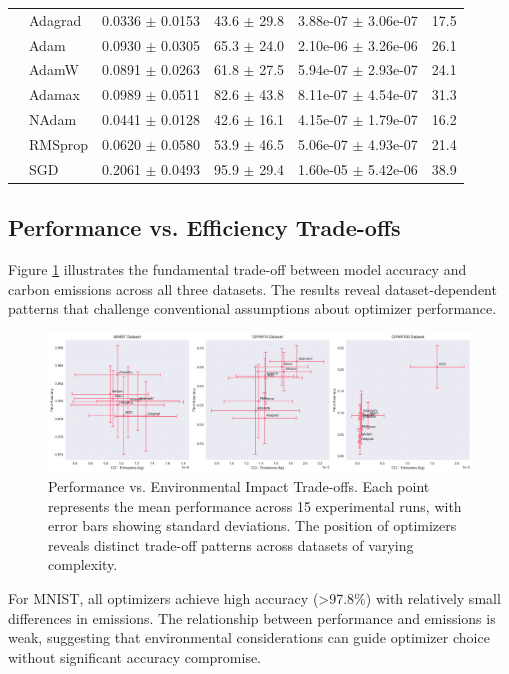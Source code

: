 \documentclass[conference]{IEEEtran}
\begin{document}
\begin{table}[htbp]
\begin{tabular}{@{}llcccr@{}}
& Adagrad & 0.0336 $\pm$ 0.0153 & 43.6 $\pm$ 29.8 & 3.88e-07 $\pm$ 3.06e-07 & 17.5 \\
& Adam & 0.0930 $\pm$ 0.0305 & 65.3 $\pm$ 24.0 & 2.10e-06 $\pm$ 3.26e-06 & 26.1 \\
& AdamW & 0.0891 $\pm$ 0.0263 & 61.8 $\pm$ 27.5 & 5.94e-07 $\pm$ 2.93e-07 & 24.1 \\
& Adamax & 0.0989 $\pm$ 0.0511 & 82.6 $\pm$ 43.8 & 8.11e-07 $\pm$ 4.54e-07 & 31.3 \\
& NAdam & 0.0441 $\pm$ 0.0128 & 42.6 $\pm$ 16.1 & 4.15e-07 $\pm$ 1.79e-07 & 16.2 \\
& RMSprop & 0.0620 $\pm$ 0.0580 & 53.9 $\pm$ 46.5 & 5.06e-07 $\pm$ 4.93e-07 & 21.4 \\
& SGD & 0.2061 $\pm$ 0.0493 & 95.9 $\pm$ 29.4 & 1.60e-05 $\pm$ 5.42e-06 & 38.9 \\
\bottomrule
\end{tabular}
\end{table}

\subsection{Performance vs. Efficiency Trade-offs}

Figure \ref{fig:accuracy_vs_emissions} illustrates the fundamental trade-off between model accuracy and carbon emissions across all three datasets. The results reveal dataset-dependent patterns that challenge conventional assumptions about optimizer performance.

\begin{figure}[htbp]
\centering
\includegraphics[width=\textwidth]{../results/plots/accuracy_vs_emissions.png}
\caption{Performance vs. Environmental Impact Trade-offs. Each point represents the mean performance across 15 experimental runs, with error bars showing standard deviations. The position of optimizers reveals distinct trade-off patterns across datasets of varying complexity.}
\label{fig:accuracy_vs_emissions}
\end{figure}

For MNIST, all optimizers achieve high accuracy (>97.8\%) with relatively small differences in emissions. The relationship between performance and emissions is weak, suggesting that environmental considerations can guide optimizer choice without significant accuracy compromise.
\end{document}
